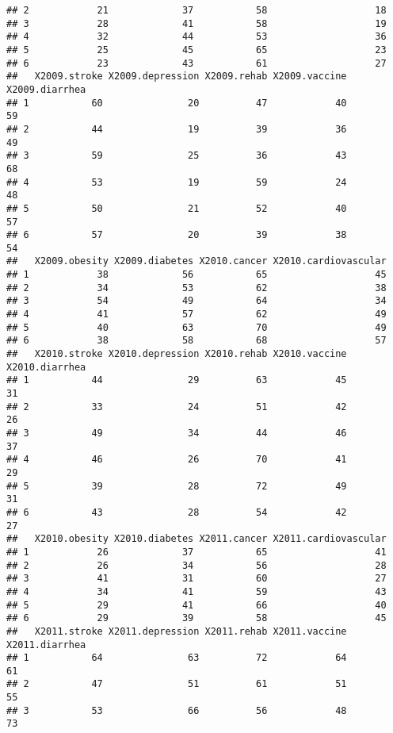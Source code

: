\documentclass[]{article}
\begin{document}
\begin{verbatim}
## 2            21             37           58                   18
## 3            28             41           58                   19
## 4            32             44           53                   36
## 5            25             45           65                   23
## 6            23             43           61                   27
##   X2009.stroke X2009.depression X2009.rehab X2009.vaccine X2009.diarrhea
## 1           60               20          47            40             59
## 2           44               19          39            36             49
## 3           59               25          36            43             68
## 4           53               19          59            24             48
## 5           50               21          52            40             57
## 6           57               20          39            38             54
##   X2009.obesity X2009.diabetes X2010.cancer X2010.cardiovascular
## 1            38             56           65                   45
## 2            34             53           62                   38
## 3            54             49           64                   34
## 4            41             57           62                   49
## 5            40             63           70                   49
## 6            38             58           68                   57
##   X2010.stroke X2010.depression X2010.rehab X2010.vaccine X2010.diarrhea
## 1           44               29          63            45             31
## 2           33               24          51            42             26
## 3           49               34          44            46             37
## 4           46               26          70            41             29
## 5           39               28          72            49             31
## 6           43               28          54            42             27
##   X2010.obesity X2010.diabetes X2011.cancer X2011.cardiovascular
## 1            26             37           65                   41
## 2            26             34           56                   28
## 3            41             31           60                   27
## 4            34             41           59                   43
## 5            29             41           66                   40
## 6            29             39           58                   45
##   X2011.stroke X2011.depression X2011.rehab X2011.vaccine X2011.diarrhea
## 1           64               63          72            64             61
## 2           47               51          61            51             55
## 3           53               66          56            48             73

\end{verbatim}
\end{document}
